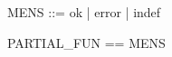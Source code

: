 \documentclass{article}
\begin{document}
\begin{zed} 
    MENS ::= ok | error | indef
\end{zed}




\begin{zed}
  PARTIAL_FUN == \nat \pfun MENS
\end{zed}
\end{document}
